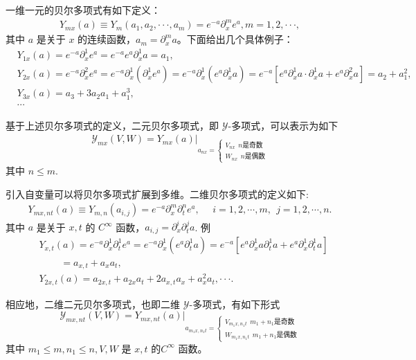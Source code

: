 一维一元的贝尔多项式有如下定义：
\begin{align}
Y_{mx}(a)\equiv Y_m(a_1, a_2, \cdot\cdot\cdot, a_m)=e^{-a} \partial_x^m e^a, m=1, 2, \cdot\cdot\cdot,   \label{method-bell-2}
\end{align}
其中 $a$ 是关于 $x$ 的连续函数，$a_m=\partial_x^m a$。下面给出几个具体例子：
\begin{align}
& Y_{1x}(a)=e^{-a} \partial_x^1 e^a=e^{-a}  e^a \partial_x^1 a=a_1,\nonumber\\
& Y_{2x}(a)=e^{-a} \partial_x^2 e^a=e^{-a} \partial_x^1 (\partial_x^1 e^a)=e^{-a} \partial_x^1(e^a \partial_x^1 a)=e^{-a}[e^{a}\partial_x^1 a\cdot\partial_x^1 a+e^a \partial_x^2 a]=a_2+a_1^2, \nonumber\\
& Y_{3x}(a)=a_3+3 a_2 a_1+a_1^3, \label{method-bell-3} \\
& \cdots\nonumber
\end{align}

基于上述贝尔多项式的定义，二元贝尔多项式，即 $\mathcal{Y}$-多项式，可以表示为如下
\begin{align}
\mathcal{Y}_{mx}(V,W)=Y_{mx}(a)|_{a_{nx}=\left\{
\begin{aligned}
V_{nx} ~~n \text{是奇数} \\
W_{nx} ~~n \text{是偶数}
\end{aligned}
\right.} \label{method-bell-4}
\end{align}
其中 $n\leq m$.

引入自变量可以将贝尔多项式扩展到多维。二维贝尔多项式的定义如下:
\begin{align}
Y_{mx,nt}(a)\equiv Y_{m,n}(a_{i,j})=e^{-a} \partial_x^m \partial_t^n e^a, ~~~~~~i=1, 2, \cdots, m,~~j=1, 2, \cdots, n. \label{method-bell-5}
\end{align}
其中 $a$ 是关于 $x, t$ 的 $C^{\infty}$ 函数，$a_{i,j}=\partial_x^i \partial_t^j a$. 例
\begin{align}
& Y_{x,t}(a)=e^{-a} \partial_x^1 \partial_t^1 e^a=e^{-a} \partial_x^1 (e^a \partial_t^1 a)=e^{-a} [e^a \partial_x^1 a \partial_t^1 a+e^a \partial_x^1 \partial_t^1 a]
\nonumber\\
&~~~~~~~~~~
=a_{x,t}+a_x a_t,\nonumber\\
& Y_{2x,t}(a)=a_{2x,t}+a_{2x} a_t+2 a_{x,t} a_x+a_x^2 a_t, \cdot\cdot\cdot. \label{method-bell-6}
\end{align}

相应地，二维二元贝尔多项式，也即二维 $\mathcal{Y}$-多项式，有如下形式
\begin{equation}
\mathcal{Y}_{mx,nt}(V,W)=Y_{mx,nt}(a)|_{a_{m_1x,n_1t}=
\begin{cases}
V_{m_1x,n_1t} ~~m_1+n_1 \text{是奇数} \\
W_{m_1x,n_1t} ~~m_1+n_1 \text{是偶数}
\end{cases}
}\label{method-bell-7}
\end{equation}
其中 $m_1\leq m, n_1\leq n, V, W$ 是 $x,t$ 的$C^{\infty}$ 函数。

